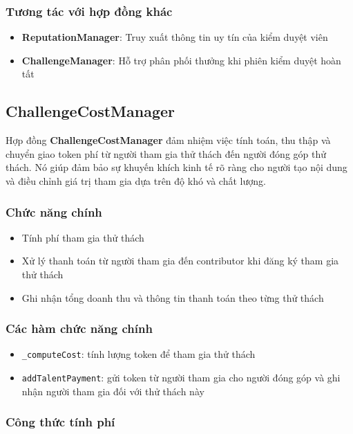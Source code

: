 \subsubsection{Tương tác với hợp đồng khác}

\begin{itemize}
  \item \textbf{ReputationManager}: Truy xuất thông tin uy tín của kiểm duyệt viên
  \item \textbf{ChallengeManager}: Hỗ trợ phân phối thưởng khi phiên kiểm duyệt hoàn tất
\end{itemize}

\subsection{ChallengeCostManager}

Hợp đồng \textbf{ChallengeCostManager} đảm nhiệm việc tính toán, thu thập và chuyển giao token phí từ người tham gia thử thách đến người đóng góp thử thách.
Nó giúp đảm bảo sự khuyến khích kinh tế rõ ràng cho người tạo nội dung và điều chỉnh giá trị tham gia dựa trên độ khó và chất lượng.

\subsubsection{Chức năng chính}

\begin{itemize}
  \item Tính phí tham gia thử thách
  \item Xử lý thanh toán từ người tham gia đến contributor khi đăng ký tham gia thử thách
  \item Ghi nhận tổng doanh thu và thông tin thanh toán theo từng thử thách
\end{itemize}

\subsubsection{Các hàm chức năng chính}

\begin{itemize}
  \item \texttt{\_computeCost}: tính lượng token để tham gia thử thách
  \item \texttt{addTalentPayment}: gửi token từ người tham gia cho người đóng góp và ghi nhận người tham gia đối với thử thách này
\end{itemize}

\subsubsection{Công thức tính phí}

